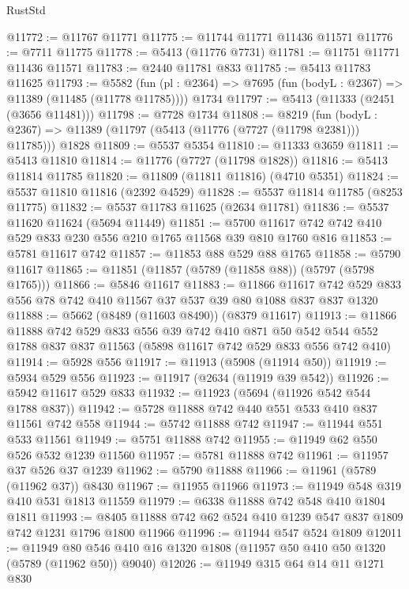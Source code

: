 \begin{lexlean}{RustStd}
\begin{coremodule}
@11772 := @11767 @11771
@11775 := @11744 @11771 @11436 @11571
@11776 := @7711 @11775
@11778 := @5413 (@11776 @7731)
@11781 := @11751 @11771 @11436 @11571
@11783 := @2440 @11781 @833
@11785 := @5413 @11783 @11625
@11793 := @5582
    (fun (pl : @2364) => @7695 (fun (bodyL : @2367) => @11389 (@11485 (@11778 @11785))))
    @1734
@11797 := @5413 (@11333 (@2451 (@3656 @11481)))
@11798 := @7728 @1734
@11808 := @8219
    (fun (bodyL : @2367) => @11389 (@11797 (@5413 (@11776 (@7727 (@11798 @2381))) @11785)))
    @1828
@11809 := @5537 @5354
@11810 := @11333 @3659
@11811 := @5413 @11810
@11814 := @11776 (@7727 (@11798 @1828))
@11816 := @5413 @11814 @11785
@11820 := @11809 (@11811 @11816) (@4710 @5351)
@11824 := @5537 @11810 @11816 (@2392 @4529)
@11828 := @5537 @11814 @11785 (@8253 @11775)
@11832 := @5537 @11783 @11625 (@2634 @11781)
@11836 := @5537 @11620 @11624 (@5694 @11449)
@11851 := @5700 @11617 @742 @742 @410 @529 @833 @230 @556 @210 @1765 @11568 @39 @810 @1760 @816
@11853 := @5781 @11617 @742
@11857 := @11853 @88 @529 @88 @1765
@11858 := @5790 @11617
@11865 := @11851 (@11857 (@5789 (@11858 @88)) (@5797 (@5798 @1765)))
@11866 := @5846 @11617
@11883 := @11866
    @11617
    @742
    @529
    @833
    @556
    @78
    @742
    @410
    @11567
    @37
    @537
    @39
    @80
    @1088
    @837
    @837
    @1320
@11888 := @5662 (@8489 (@11603 @8490)) (@8379 @11617)
@11913 := @11866
    @11888
    @742
    @529
    @833
    @556
    @39
    @742
    @410
    @871
    @50
    @542
    @544
    @552
    @1788
    @837
    @837
    @11563
    (@5898 @11617 @742 @529 @833 @556 @742 @410)
@11914 := @5928 @556
@11917 := @11913 (@5908 (@11914 @50))
@11919 := @5934 @529 @556
@11923 := @11917 (@2634 (@11919 @39 @542))
@11926 := @5942 @11617 @529 @833
@11932 := @11923 (@5694 (@11926 @542 @544 @1788 @837))
@11942 := @5728 @11888 @742 @440 @551 @533 @410 @837 @11561 @742 @558
@11944 := @5742 @11888 @742
@11947 := @11944 @551 @533 @11561
@11949 := @5751 @11888 @742
@11955 := @11949 @62 @550 @526 @532 @1239 @11560
@11957 := @5781 @11888 @742
@11961 := @11957 @37 @526 @37 @1239
@11962 := @5790 @11888
@11966 := @11961 (@5789 (@11962 @37)) @8430
@11967 := @11955 @11966
@11973 := @11949 @548 @319 @410 @531 @1813 @11559
@11979 := @6338 @11888 @742 @548 @410 @1804 @1811
@11993 := @8405 @11888 @742 @62 @524 @410 @1239 @547 @837 @1809 @742 @1231 @1796 @1800 @11966
@11996 := @11944 @547 @524 @1809
@12011 := @11949
    @80
    @546
    @410
    @16
    @1320
    @1808
    (@11957 @50 @410 @50 @1320 (@5789 (@11962 @50)) @9040)
@12026 := @11949
    @315
    @64
    @14
    @11
    @1271
    @830

\end{coremodule}
\end{lexlean}
